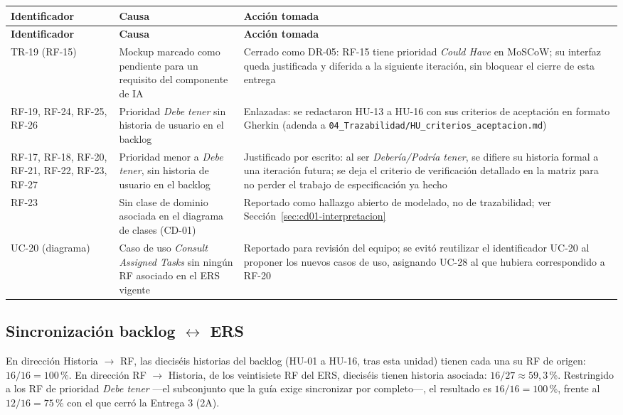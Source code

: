\begin{center}
\begin{longtable}{|p{2.6cm}|p{5.5cm}|p{5cm}|}
\hline
\textbf{Identificador} & \textbf{Causa} & \textbf{Acción tomada} \\
\hline
\endfirsthead
\hline
\textbf{Identificador} & \textbf{Causa} & \textbf{Acción tomada} \\
\hline
\endhead
\hline
\endfoot
\hline
\endlastfoot
TR-19 (RF-15) & Mockup marcado como pendiente para un requisito del componente de IA &
Cerrado como DR-05: RF-15 tiene prioridad \emph{Could Have} en MoSCoW; su interfaz queda
justificada y diferida a la siguiente iteración, sin bloquear el cierre de esta entrega \\
\hline
RF-19, RF-24, RF-25, RF-26 & Prioridad \emph{Debe tener} sin historia de usuario en el backlog &
Enlazadas: se redactaron HU-13 a HU-16 con sus criterios de aceptación en formato Gherkin
(adenda a \texttt{04\_Trazabilidad/HU\_criterios\_aceptacion.md}) \\
\hline
RF-17, RF-18, RF-20, RF-21, RF-22, RF-23, RF-27 & Prioridad menor a \emph{Debe tener}, sin
historia de usuario en el backlog & Justificado por escrito: al ser \emph{Debería/Podría tener},
se difiere su historia formal a una iteración futura; se deja el criterio de verificación
detallado en la matriz para no perder el trabajo de especificación ya hecho \\
\hline
RF-23 & Sin clase de dominio asociada en el diagrama de clases (CD-01) & Reportado como hallazgo
abierto de modelado, no de trazabilidad; ver Sección~\ref{sec:cd01-interpretacion} \\
\hline
UC-20 (diagrama) & Caso de uso \emph{Consult Assigned Tasks} sin ningún RF asociado en el ERS
vigente & Reportado para revisión del equipo; se evitó reutilizar el identificador UC-20 al
proponer los nuevos casos de uso, asignando UC-28 al que hubiera correspondido a RF-20 \\
\hline
\end{longtable}
\end{center}

\subsection{Sincronización backlog $\leftrightarrow$ ERS}
\label{sec:sincronizacion}

En dirección Historia $\rightarrow$ RF, las dieciséis historias del backlog (HU-01 a HU-16, tras
esta unidad) tienen cada una su RF de origen: $16/16 = 100$\,\%. En dirección RF
$\rightarrow$ Historia, de los veintisiete RF del ERS, dieciséis tienen historia asociada:
$16/27 \approx 59{,}3$\,\%. Restringido a los RF de prioridad \emph{Debe tener} —el subconjunto
que la guía exige sincronizar por completo—, el resultado es $16/16 = 100$\,\%, frente al
$12/16 = 75$\,\% con el que cerró la Entrega 3 (2A).


